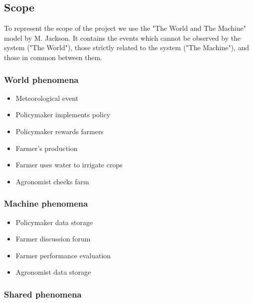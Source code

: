 \subsection{Scope}
To represent the scope of the project we use the "The World and The Machine" model by M. Jackson. 
It contains the events which cannot be observed by the system ("The World"), 
those strictly related to the system ("The Machine"), and those in common between them. 

\subsubsection{World phenomena}
\begin{itemize}
    \item Meteorological event
    \item Policymaker implements policy
    \item Policymaker rewards farmers
    \item Farmer's production
    \item Farmer uses water to irrigate crops
    \item Agronomist checks farm
\end{itemize}

\subsubsection{Machine phenomena}
\begin{itemize}
    \item Policymaker data storage
    \item Farmer discussion forum
    \item Farmer performance evaluation
    \item Agronomist data storage
\end{itemize}

\subsubsection{Shared phenomena}

